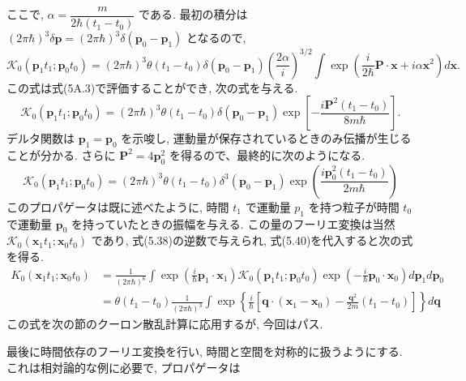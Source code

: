 \documentclass{jsarticle}
\begin{document}
ここで, $\alpha = \dfrac{m}{2\hbar(t_1 - t_0)}$ である. 最初の積分は $(2\pi\hbar)^3 \delta\mathbf{p} = (2\pi\hbar)^3 \delta(\mathbf{p}_0 - \mathbf{p}_1)$ となるので,
\begin{equation*}
    \mathcal{K}_0(\mathbf{p}_1  t_1; \mathbf{p}_0 t_0) = (2\pi \hbar)^3 \theta(t_1 - t_0) \delta(\mathbf{p}_0 - \mathbf{p}_1) \left( \frac{2\alpha}{i} \right)^{3/2} \int \exp \left( \frac{i}{2\hbar} \mathbf{P} \cdot \mathbf{x} + i\alpha\mathbf{x}^2 \right) d\mathbf{x}.
\end{equation*}
この式は式(5A.3)で評価することができ, 次の式を与える.
\begin{equation*}
    \mathcal{K}_0(\mathbf{p}_1  t_1; \mathbf{p}_0 t_0) = (2\pi \hbar)^3 \theta(t_1 - t_0) \delta(\mathbf{p}_0 - \mathbf{p}_1) \exp \left[ -\frac{i\mathbf{P}^2 (t_1 - t_0)}{8m\hbar} \right].
\end{equation*}
デルタ関数は $\mathbf{p}_1 = \mathbf{p}_0$ を示唆し, 運動量が保存されているときのみ伝播が生じることが分かる. さらに $\mathbf{P}^2 = 4\mathbf{p}_{0}^2$ を得るので、最終的に次のようになる.
\begin{equation*}
    \mathcal{K}_0(\mathbf{p}_1  t_1; \mathbf{p}_0 t_0) = (2\pi \hbar)^3 \theta(t_1 - t_0) \delta^3(\mathbf{p}_0 - \mathbf{p}_1) \exp \left( \frac{i\mathbf{p}_{0}^2 (t_1 - t_0)}{2m\hbar} \right) \tag{5.40}
\end{equation*}
このプロパゲータは既に述べたように, 時間 $t_1$ で運動量 $p_1$ を持つ粒子が時間 $t_0$ で運動量 $\mathbf{p}_0$ を持っていたときの振幅を与える. この量のフーリエ変換は当然 $\mathcal{K}_0(\mathbf{x}_1 t_1; \mathbf{x}_0 t_0)$ であり, 式(5.38)の逆数で与えられ, 式(5.40)を代入すると次の式を得る.
\begin{align*}
    K_0(\mathbf{x}_1 t_1; \mathbf{x}_0 t_0) &= \frac{1}{(2\pi \hbar)^6} \int \exp \left( \frac{i}{\hbar} \mathbf{p}_1 \cdot \mathbf{x}_1 \right) \mathcal{K}_0(\mathbf{p}_1  t_1; \mathbf{p}_0 t_0) \exp \left( -\frac{i}{\hbar} \mathbf{p}_0 \cdot \mathbf{x}_0 \right) d\mathbf{p}_1 d\mathbf{p}_0\\
    &= \theta(t_1 -t_0)\frac{1}{(2\pi\hbar)^3}\int\exp\left\{ \frac{i}{\hbar}\left[ \mathbf{q} \cdot (\mathbf{x}_1 - \mathbf{x}_0) - \frac{\mathbf{q}^2}{2m}(t_1 - t_0) \right] \right\}d\mathbf{q} \tag{5.41}
\end{align*}
この式を次の節のクーロン散乱計算に応用するが, 今回はパス.\par
最後に時間依存のフーリエ変換を行い, 時間と空間を対称的に扱うようにする. \\
これは相対論的な例に必要で, プロパゲータは
\end{document}
